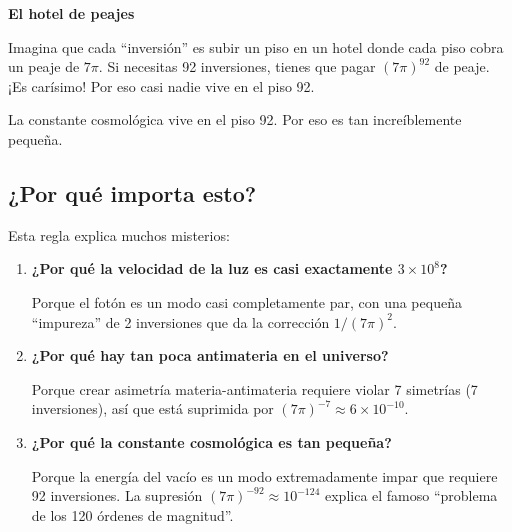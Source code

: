 \documentclass[12pt,a4paper,openany]{book}
\begin{document}
\begin{nivelnarrativo}
\begin{analogiabox}
\textbf{El hotel de peajes}

Imagina que cada ``inversión'' es subir un piso en un hotel donde cada piso cobra un peaje de $7\pi$. Si necesitas 92 inversiones, tienes que pagar $(7\pi)^{92}$ de peaje. ¡Es carísimo! Por eso casi nadie vive en el piso 92.

La constante cosmológica vive en el piso 92. Por eso es tan increíblemente pequeña.
\end{analogiabox}

\subsection*{¿Por qué importa esto?}

Esta regla explica muchos misterios:

\begin{enumerate}
    \item \textbf{¿Por qué la velocidad de la luz es casi exactamente $3 \times 10^8$?}

    Porque el fotón es un modo casi completamente par, con una pequeña ``impureza'' de 2 inversiones que da la corrección $1/(7\pi)^2$.

    \item \textbf{¿Por qué hay tan poca antimateria en el universo?}

    Porque crear asimetría materia-antimateria requiere violar 7 simetrías (7 inversiones), así que está suprimida por $(7\pi)^{-7} \approx 6 \times 10^{-10}$.

    \item \textbf{¿Por qué la constante cosmológica es tan pequeña?}

    Porque la energía del vacío es un modo extremadamente impar que requiere 92 inversiones. La supresión $(7\pi)^{-92} \approx 10^{-124}$ explica el famoso ``problema de los 120 órdenes de magnitud''.
\end{enumerate}

\end{nivelnarrativo}
\end{document}
